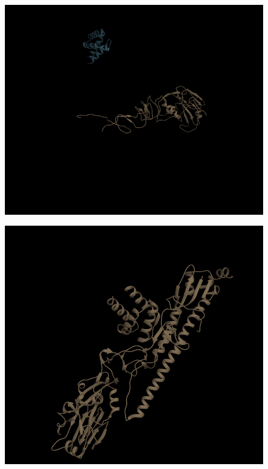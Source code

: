 \documentclass{article}
\begin{document}
\begin{figure}
\centering

\begin{minipage}{.50\textwidth}
  \centering
  \includegraphics[width=.9\linewidth]{t50_initial}
  \label{fig:test1}

  \centering
  \includegraphics[width=.9\linewidth]{t50_native}
  \label{fig:test2}


\end{minipage}
\end{figure}
\end{document}

